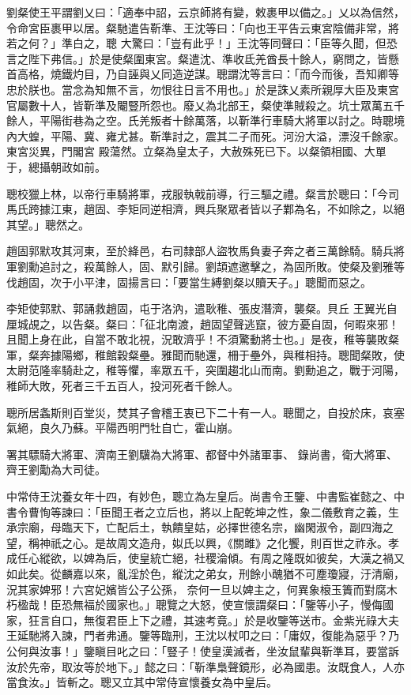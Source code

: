 \begin{pinyinscope}
 劉粲使王平謂劉乂曰：「適奉中詔，云京師將有變，敕裹甲以備之。」乂以為信然，令命宮臣裹甲以居。粲馳遣告靳準、王沈等曰：「向也王平告云東宮陰備非常，將若之何？」準白之，聰
 大驚曰：「豈有此乎！」王沈等同聲曰：「臣等久聞，但恐言之陛下弗信。」於是使粲圍東宮。粲遣沈、準收氐羌酋長十餘人，窮問之，皆懸首高格，燒鐵灼目，乃自誣與乂同造逆謀。聰謂沈等言曰：「而今而後，吾知卿等忠於朕也。當念為知無不言，勿恨往日言不用也。」於是誅乂素所親厚大臣及東宮官屬數十人，皆靳準及閹豎所怨也。廢乂為北部王，粲使準賊殺之。坑士眾萬五千餘人，平陽街巷為之空。氏羌叛者十餘萬落，以靳準行車騎大將軍以討之。時聰境內大蝗，平陽、冀、雍尤甚。靳準討之，震其二子而死。河汾大溢，漂沒千餘家。東宮災異，門閣宮
 殿蕩然。立粲為皇太子，大赦殊死已下。以粲領相國、大單于，總攝朝政如前。



 聰校獵上林，以帝行車騎將軍，戎服執戟前導，行三驅之禮。粲言於聰曰：「今司馬氏跨據江東，趙固、李矩同逆相濟，興兵聚眾者皆以子鄴為名，不如除之，以絕其望。」聰然之。



 趙固郭默攻其河東，至於絳邑，右司隸部人盜牧馬負妻子奔之者三萬餘騎。騎兵將軍劉勳追討之，殺萬餘人，固、默引歸。劉頡遮邀擊之，為固所敗。使粲及劉雅等伐趙固，次于小平津，固揚言曰：「要當生縛劉粲以贖天子。」聰聞而惡之。



 李矩使郭默、郭誦救趙固，屯于洛汭，遣耿稚、張皮潛濟，襲粲。貝丘
 王翼光自厘城覘之，以告粲。粲曰：「征北南渡，趙固望聲逃竄，彼方憂自固，何暇來邪！且聞上身在此，自當不敢北視，況敢濟乎！不須驚動將士也。」是夜，稚等襲敗粲軍，粲奔據陽鄉，稚館穀粲壘。雅聞而馳還，柵于壘外，與稚相持。聰聞粲敗，使太尉范隆率騎赴之，稚等懼，率眾五千，突圍趨北山而南。劉勳追之，戰于河陽，稚師大敗，死者三千五百人，投河死者千餘人。



 聰所居螽斯則百堂災，焚其子會稽王衷已下二十有一人。聰聞之，自投於床，哀塞氣絕，良久乃蘇。平陽西明門牡自亡，霍山崩。



 署其驃騎大將軍、濟南王劉驥為大將軍、都督中外諸軍事、
 錄尚書，衛大將軍、齊王劉勱為大司徒。



 中常侍王沈養女年十四，有妙色，聰立為左皇后。尚書令王鑒、中書監崔懿之、中書令曹恂等諫曰：「臣聞王者之立后也，將以上配乾坤之性，象二儀敷育之義，生承宗廟，母臨天下，亡配后土，執饋皇姑，必擇世德名宗，幽閑淑令，副四海之望，稱神祇之心。是故周文造舟，姒氏以興，《關雎》之化饗，則百世之祚永。孝成任心縱欲，以婢為后，使皇統亡絕，社稷淪傾。有周之隆既如彼矣，大漢之禍又如此矣。從麟嘉以來，亂淫於色，縱沈之弟女，刑餘小醜猶不可塵瓊寢，汙清廟，況其家婢邪！六宮妃嬪皆公子公孫，
 奈何一旦以婢主之，何異象榱玉簀而對腐木朽楹哉！臣恐無福於國家也。」聰覽之大怒，使宣懷謂粲曰：「鑒等小子，慢侮國家，狂言自口，無復君臣上下之禮，其速考竟。」於是收鑒等送市。金紫光祿大夫王延馳將入諫，門者弗通。鑒等臨刑，王沈以杖叩之曰：「庸奴，復能為惡乎？乃公何與汝事！」鑒瞋目叱之曰：「豎子！使皇漢滅者，坐汝鼠輩與靳準耳，要當訴汝於先帝，取汝等於地下。」懿之曰：「靳準梟聲鏡形，必為國患。汝既食人，人亦當食汝。」皆斬之。聰又立其中常侍宣懷養女為中皇后。




\end{pinyinscope}
